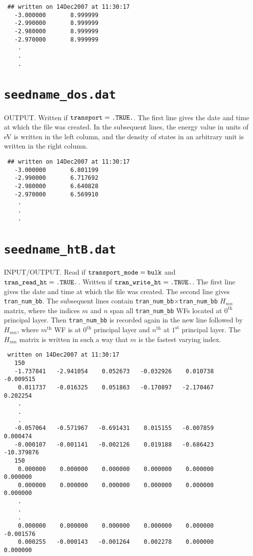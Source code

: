 \begin{verbatim}
 ## written on 14Dec2007 at 11:30:17
   -3.000000       8.999999
   -2.990000       8.999999
   -2.980000       8.999999
   -2.970000       8.999999
    .
    .
    .
\end{verbatim}

\section{{\tt seedname\_dos.dat}}
OUTPUT. Written if $\verb#transport#=\verb#.TRUE.#$.
The first line gives the date and
time at which the file was created. 
In the subsequent lines, the energy value
in units of eV is written in the left column,
and the density of states in an arbitrary unit
is written in the right column.
 
\begin{verbatim}
 ## written on 14Dec2007 at 11:30:17
   -3.000000       6.801199
   -2.990000       6.717692
   -2.980000       6.640828
   -2.970000       6.569910
    .
    .
    .
\end{verbatim}


\section{{\tt seedname\_htB.dat}}

INPUT/OUTPUT. 
Read if 
$\verb#transport_mode#=\verb#bulk#$
and $\verb#tran_read_ht#=\verb#.TRUE.#$.
Written if $\verb#tran_write_ht#=\verb#.TRUE.#$. 
The first line gives the date and
time at which the file was created. 
The second line gives \verb#tran_num_bb#.
The subsequent lines contain 
\verb#tran_num_bb#$\times$\verb#tran_num_bb#
$H_{mn}$ matrix, where the indices
$m$ and $n$ span all \verb#tran_num_bb# WFs
located at $0^{\mathrm{th}}$ principal layer.
Then \verb#tran_num_bb# is recorded again in the new line 
followed by $H_{mn}$, where
$m^{\mathrm{th}}$ WF is 
at $0^{\mathrm{th}}$ principal layer
and $n^{\mathrm{th}}$ at $1^{\mathrm{st}}$ principal layer.
The $H_{mn}$ matrix is written in such a way that
$m$ is the fastest varying index.

\begin{verbatim}
 written on 14Dec2007 at 11:30:17
   150
   -1.737841   -2.941054    0.052673   -0.032926    0.010738   -0.009515
    0.011737   -0.016325    0.051863   -0.170897   -2.170467    0.202254
    .
    .
    .
   -0.057064   -0.571967   -0.691431    0.015155   -0.007859    0.000474
   -0.000107   -0.001141   -0.002126    0.019188   -0.686423  -10.379876
   150
    0.000000    0.000000    0.000000    0.000000    0.000000    0.000000
    0.000000    0.000000    0.000000    0.000000    0.000000    0.000000
    .
    .
    .
    0.000000    0.000000    0.000000    0.000000    0.000000   -0.001576
    0.000255   -0.000143   -0.001264    0.002278    0.000000    0.000000
\end{verbatim}

